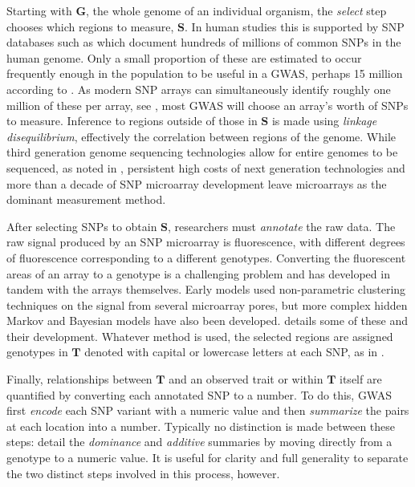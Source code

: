 \documentclass{article}
\newcommand{\m}[1]{\mathbf{#1}}               %
\begin{document}
Starting with $\m{G}$, the whole genome of an individual organism, the \emph{select} step chooses which regions to measure, $\m{S}$. In human studies this is supported by SNP databases such as \cite{NCBIdbSNP} which document hundreds of millions of common SNPs in the human genome. Only a small proportion of these are estimated to occur frequently enough in the population to be useful in a GWAS, perhaps 15 million according to \cite{koboldtetal2013next}. As modern SNP arrays can simultaneously identify roughly one million of these per array, see \cite{laframboise2009, tametal2019benefits}, most GWAS will choose an array's worth of SNPs to measure. Inference to regions outside of those in $\m{S}$ is made using \emph{linkage disequilibrium}, effectively the correlation between regions of the genome. While third generation genome sequencing technologies allow for entire genomes to be sequenced, as noted in \cite{heatherchain2016sequencers, hasinetal2017multi, uffelmannetal2021gwas}, persistent high costs of next generation technologies and more than a decade of SNP microarray development leave microarrays as the dominant measurement method.

After selecting SNPs to obtain $\m{S}$, researchers must \emph{annotate} the raw data. The raw signal produced by an SNP microarray is fluorescence, with different degrees of fluorescence corresponding to a different genotypes. Converting the fluorescent areas of an array to a genotype is a challenging problem and has developed in tandem with the arrays themselves. Early models used non-parametric clustering techniques on the signal from several microarray pores, but more complex hidden Markov and Bayesian models have also been developed. \cite{laframboise2009} details some of these and their development. Whatever method is used, the selected regions are assigned genotypes in $\m{T}$ denoted with capital or lowercase letters at each SNP, as in \cite{siegmundyakir2007, visschergoddard2019}.

Finally, relationships between $\m{T}$ and an observed trait or within $\m{T}$ itself are quantified by converting each annotated SNP to a number. To do this, GWAS first \emph{encode} each SNP variant with a numeric value and then \emph{summarize} the pairs at each location into a number. Typically no distinction is made between these steps: \cite{LanderBotstein1989, cheverud2001, siegmundyakir2007} detail the \emph{dominance} and \emph{additive} summaries by moving directly from a genotype to a numeric value. It is useful for clarity and full generality to separate the two distinct steps involved in this process, however.
\end{document}
